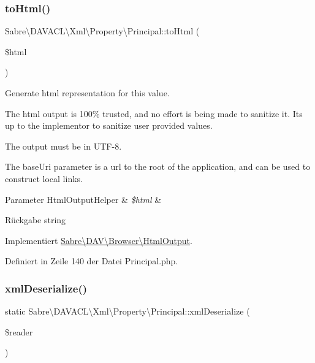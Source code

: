 \subsubsection{\texorpdfstring{to\+Html()}{toHtml()}}
{\footnotesize\ttfamily Sabre\textbackslash{}\+D\+A\+V\+A\+C\+L\textbackslash{}\+Xml\textbackslash{}\+Property\textbackslash{}\+Principal\+::to\+Html (\begin{DoxyParamCaption}\item[{\mbox{\hyperlink{class_sabre_1_1_d_a_v_1_1_browser_1_1_html_output_helper}{Html\+Output\+Helper}}}]{\$html }\end{DoxyParamCaption})}

Generate html representation for this value.

The html output is 100\% trusted, and no effort is being made to sanitize it. It\textquotesingle{}s up to the implementor to sanitize user provided values.

The output must be in U\+T\+F-\/8.

The base\+Uri parameter is a url to the root of the application, and can be used to construct local links.


\begin{DoxyParams}[1]{Parameter}
Html\+Output\+Helper & {\em \$html} & \\
\hline
\end{DoxyParams}
\begin{DoxyReturn}{Rückgabe}
string 
\end{DoxyReturn}


Implementiert \mbox{\hyperlink{interface_sabre_1_1_d_a_v_1_1_browser_1_1_html_output_a53a24f82474cef8c1fcf00e87de3bf7c}{Sabre\textbackslash{}\+D\+A\+V\textbackslash{}\+Browser\textbackslash{}\+Html\+Output}}.



Definiert in Zeile 140 der Datei Principal.\+php.

\mbox{\label{class_sabre_1_1_d_a_v_a_c_l_1_1_xml_1_1_property_1_1_principal_a388eb5914cdc0d2007375350cdcc327e}} 
\subsubsection{\texorpdfstring{xml\+Deserialize()}{xmlDeserialize()}}
{\footnotesize\ttfamily static Sabre\textbackslash{}\+D\+A\+V\+A\+C\+L\textbackslash{}\+Xml\textbackslash{}\+Property\textbackslash{}\+Principal\+::xml\+Deserialize (\begin{DoxyParamCaption}\item[{\mbox{\hyperlink{class_sabre_1_1_xml_1_1_reader}{Reader}}}]{\$reader }\end{DoxyParamCaption})\hspace{0.3cm}{\ttfamily [static]}}

